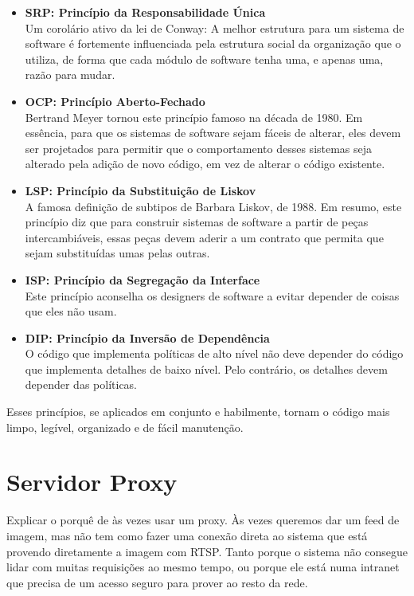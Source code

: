 \documentclass[12pt, %
openright, 
oneside, %
a4paper,    %
brazil]{facom-ufu-abntex2}
\begin{document}
\begin{itemize}
	\item \textbf{SRP: Princípio da Responsabilidade Única}\\
	      Um corolário ativo da lei de Conway: A melhor estrutura para um sistema de software é fortemente influenciada pela estrutura social da organização que o utiliza, de forma que cada módulo de software tenha uma, e apenas uma, razão para mudar.

	\item \textbf{OCP: Princípio Aberto-Fechado}\\
	      Bertrand Meyer tornou este princípio famoso na década de 1980. Em essência, para que os sistemas de software sejam fáceis de alterar, eles devem ser projetados para permitir que o comportamento desses sistemas seja alterado pela adição de novo código, em vez de alterar o código existente.

	\item \textbf{LSP: Princípio da Substituição de Liskov}\\
	      A famosa definição de subtipos de Barbara Liskov, de 1988. Em resumo, este princípio diz que para construir sistemas de software a partir de peças intercambiáveis, essas peças devem aderir a um contrato que permita que sejam substituídas umas pelas outras.

	\item \textbf{ISP: Princípio da Segregação da Interface}\\
	      Este princípio aconselha os designers de software a evitar depender de coisas que eles não usam.

	\item \textbf{DIP: Princípio da Inversão de Dependência}\\
	      O código que implementa políticas de alto nível não deve depender do código que implementa detalhes de baixo nível. Pelo contrário, os detalhes devem depender das políticas.
\end{itemize}

Esses princípios, se aplicados em conjunto e habilmente, tornam o código mais
limpo, legível, organizado e de fácil manutenção. \cite{martin2017clean}

\section{Servidor Proxy}

Explicar o porquê de às vezes usar um proxy. Às vezes queremos dar um feed de
imagem, mas não tem como fazer uma conexão direta ao sistema que está provendo
diretamente a imagem com RTSP. Tanto porque o sistema não consegue lidar com
muitas requisições ao mesmo tempo, ou porque ele está numa intranet que precisa
de um acesso seguro para prover ao resto da rede.
\end{document}
